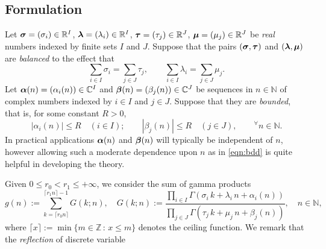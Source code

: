 \documentclass[a4paper,12pt]{article}
\theoremstyle{plain}
\def\C{\mathbb{C}}
\def\N{\mathbb{N}}
\def\R{\mathbb{R}}
\def\Z{\mathbb{Z}}
\def\vG{\varGamma}
\def\bal{\mbox{\boldmath $\alpha$}}
\def\bbeta{\mbox{\boldmath $\beta$}}
\def\blambda{\mbox{\boldmath $\lambda$}}
\def\bmu{\mbox{\boldmath $\mu$}}
\def\bsigma{\mbox{\boldmath $\sigma$}}
\def\btau{\mbox{\boldmath $\tau$}}
\begin{document}
\subsection{Formulation} \label{subsec:miar}
Let $\bsigma = (\sigma_i) \in \R^I$, $\blambda = (\lambda_i) \in \R^I$, 
$\btau = (\tau_j) \in \R^J$, $\bmu = (\mu_j) \in \R^J$ be {\sl real} numbers 
indexed by finite sets $I$ and $J$. 
Suppose that the pairs $(\bsigma, \btau)$ and $(\blambda, \bmu)$ are {\sl balanced} 
to the effect that   
\begin{equation} \label{eqn:ap-bq2}
\sum_{i \in I} \sigma_i = \sum_{j \in J} \tau_j, \qquad 
\sum_{i \in I} \lambda_i = \sum_{j \in J} \mu_j.    
\end{equation}
Let $\bal(n) = (\alpha_i(n)) \in \C^I$ and $\bbeta(n) = (\beta_j(n))  \in \C^J$ be 
sequences in $n \in \N$ of complex numbers indexed by $i \in I$ and $j \in J$. 
Suppose that they are {\sl bounded}, that is, for some constant $R > 0$,   
\begin{equation} \label{eqn:bdd}
|\alpha_i(n) | \le R \quad (i \in I); \qquad |\beta_j(n) | \le R \quad (j \in J), 
\qquad {}^{\forall}n \in \N.  
\end{equation} 
In practical applications $\bal(n)$ and $\bbeta(n)$ will typically be independent 
of $n$, however allowing such a moderate dependence upon $n$ as in 
\eqref{eqn:bdd} is quite helpful in developing the theory.  
\par
Given $0 \le r_0 < r_1 \le + \infty$, we consider the sum of gamma products  
\begin{equation} \label{eqn:g(n)}
g(n) := \sum_{k = \lceil r_0 n \rceil}^{\lceil r_1 n \rceil-1} G(k; n), \quad  
G(k; n) := \dfrac{\prod_{i \in I}
 \vG( \sigma_i \, k + \lambda_i \, n + \alpha_i(n))}{\prod_{j \in J} 
\vG( \tau_j \, k + \mu_j \, n + \beta_j(n))}, \quad n \in \N,       
\end{equation}
where $\lceil x \rceil := \min \{ m \in \Z \,:\, x \le m \}$ denotes the ceiling function.   
We remark that the {\sl reflection} of discrete variable 
\end{document}
